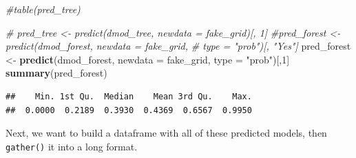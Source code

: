 \documentclass[]{article}
\newenvironment{Shaded}{\begin{snugshade}}{\end{snugshade}}
\newcommand{\KeywordTok}[1]{\textcolor[rgb]{0.13,0.29,0.53}{\textbf{{#1}}}}
\newcommand{\DataTypeTok}[1]{\textcolor[rgb]{0.13,0.29,0.53}{{#1}}}
\newcommand{\DecValTok}[1]{\textcolor[rgb]{0.00,0.00,0.81}{{#1}}}
\newcommand{\StringTok}[1]{\textcolor[rgb]{0.31,0.60,0.02}{{#1}}}
\newcommand{\CommentTok}[1]{\textcolor[rgb]{0.56,0.35,0.01}{\textit{{#1}}}}
\newcommand{\NormalTok}[1]{{#1}}
\begin{document}
\begin{Shaded}
\begin{Highlighting}[]
\CommentTok{#table(pred_tree)}

\CommentTok{# pred_tree <- predict(dmod_tree, newdata = fake_grid)[, 1]}
\CommentTok{#pred_forest <- predict(dmod_forest, newdata = fake_grid, }
\CommentTok{#                       type = "prob")[, "Yes"]}
\NormalTok{pred_forest <-}\StringTok{ }\KeywordTok{predict}\NormalTok{(dmod_forest, }\DataTypeTok{newdata =} \NormalTok{fake_grid, }\DataTypeTok{type =} \StringTok{"prob"}\NormalTok{)[,}\DecValTok{1}\NormalTok{]}
\KeywordTok{summary}\NormalTok{(pred_forest)}
\end{Highlighting}
\end{Shaded}

\begin{verbatim}
##    Min. 1st Qu.  Median    Mean 3rd Qu.    Max. 
##  0.0000  0.2189  0.3930  0.4369  0.6567  0.9950
\end{verbatim}

\begin{Shaded}
\end{Shaded}

Next, we want to build a dataframe with all of these predicted models,
then \texttt{gather()} it into a long format.

\begin{Shaded}
\end{Shaded}
\end{document}
